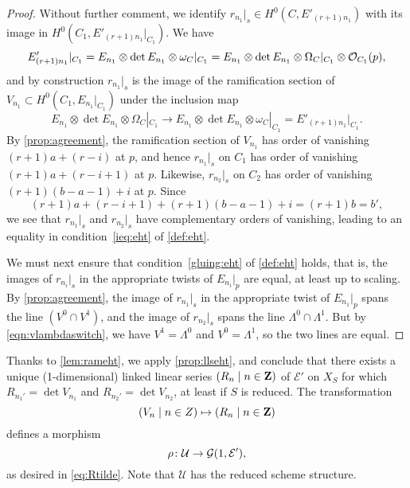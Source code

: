 \begin{proof}
  Without further comment, we identify $r_{n_1}|_s \in H^0(C, E'_{(r+1)n_1})$ with its image in $H^0(C_1, E'_{(r+1)n_1}|_{C_1})$.
  We have
  \[E'_{(r+1)n_1}|_{C_1} = E_{n_1} \otimes \det E_{n_1} \otimes \omega_C|_{C_1} = E_{n_1} \otimes \det E_{n_1} \otimes \Omega_C|_{C_1} \otimes \mathcal O_{C_1}(p),\]
  and by construction $r_{n_1}|_s$ is the image of the ramification section of $V_{n_1} \subset H^0(C_1, E_{n_1}|_{C_1})$ under the inclusion map
  \[ E_{n_1} \otimes \det E_{n_1} \otimes \Omega_C|_{C_1} \to E_{n_1} \otimes \det E_{n_1} \otimes \omega_C|_{C_1} = E'_{(r+1)n_1}|_{C_1}.\]
  By \autoref{prop:agreement}, the ramification section of $V_{n_1}$ has order of vanishing $(r+1)a+(r-i)$ at $p$, and hence $r_{n_1}|_s$ on $C_1$ has order of vanishing $(r+1)a+(r-i+1)$ at $p$.
  Likewise, $r_{n_2}|_s$ on $C_2$ has order of vanishing $(r+1)(b-a-1)+i$ at $p$.
  Since
  \[ (r+1)a+(r-i+1) + (r+1)(b-a-1) + i = (r+1)b = b',\]
  we see that $r_{n_1}|_s$ and $r_{n_2}|_s$ have complementary orders of vanishing, leading to an equality in condition~\eqref{ieq:eht} of \autoref{def:eht}.

  We must next ensure that condition~\eqref{gluing:eht} of \autoref{def:eht} holds, that is, the images of $r_{n_i}|_s$ in the appropriate twists of $E_{n_i}|_p$ are equal, at least up to scaling.
  By \autoref{prop:agreement}, the image of $r_{n_1}|_s$ in the appropriate twist of $E_{n_1}|_p$ spans the line $(V^0 \cap V^1)$, and the image of $r_{n_2}|_s$ spans the line $\Lambda^0 \cap \Lambda^1$.
  But by \eqref{eqn:vlambdaswitch}, we have $V^1 = \Lambda^0$ and $V^0 = \Lambda^1$, so the two lines are equal.
\end{proof}

Thanks to \autoref{lem:rameht}, we apply \autoref{prop:llseht}, and conclude that there exists a unique (1-dimensional) linked linear series $(R_n \mid n \in {\bf Z})$ of $\mathcal E'$ on $X_S$ for which $R_{n_1'} = \det V_{n_1}$ and $R_{n_2'} = \det V_{n_2}$, at least if $S$ is reduced.
The transformation
\[ (V_n \mid n \in Z) \mapsto (R_n \mid n \in {\bf Z})\]
defines a morphism
\begin{equation}\label{prop:mapreduced}
  \rho {\colon} \mathcal U \to \mathcal G(1, \mathcal E'),
\end{equation}
as desired in \eqref{eq:Rtilde}.
Note that $\mathcal U$ has the reduced scheme structure.

